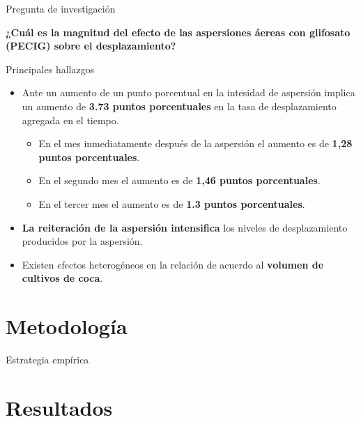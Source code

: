 \documentclass[
  ignorenonframetext,
]{beamer}
\providecommand{\tightlist}{%
  \setlength{\itemsep}{0pt}\setlength{\parskip}{0pt}}\usepackage{longtable,booktabs,array}
\begin{document}
\begin{frame}{Pregunta de investigación}
\protect\hypertarget{pregunta-de-investigaciuxf3n-1}{}
\hfill\break
\hfill\break
\hfill\break

\textbf{¿Cuál es la magnitud del efecto de las aspersiones áereas con
glifosato (PECIG) sobre el desplazamiento?}
\end{frame}

\begin{frame}{Principales hallazgos}
\protect\hypertarget{principales-hallazgos}{}
\hfill\break

\begin{itemize}
\item
  Ante un aumento de un punto porcentual en la intesidad de aspersión
  implica un aumento de \textbf{3.73 puntos porcentuales} en la tasa de
  desplazamiento agregada en el tiempo.

  \begin{itemize}
  \tightlist
  \item
    En el mes inmediatamente después de la aspersión el aumento es de
    \textbf{1,28 puntos porcentuales}.
  \item
    En el segundo mes el aumento es de \textbf{1,46 puntos
    porcentuales}.
  \item
    En el tercer mes el aumento es de \textbf{1.3 puntos porcentuales}.
  \end{itemize}
\item
  \textbf{La reiteración de la aspersión intensifica} los niveles de
  desplazamiento producidos por la aspersión.
\item
  Existen efectos heterogéneos en la relación de acuerdo al
  \textbf{volumen de cultivos de coca}.
\end{itemize}
\end{frame}

\hypertarget{metodologuxeda}{%
\section{Metodología}\label{metodologuxeda}}

\begin{frame}{Estrategia empírica}
\protect\hypertarget{estrategia-empuxedrica}{}
\end{frame}

\hypertarget{resultados}{%
\section{Resultados}\label{resultados}}
\end{document}
